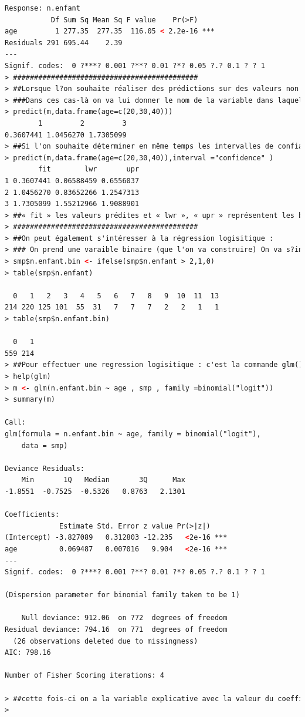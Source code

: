 \begin{lstlisting}[language=html]
Response: n.enfant
           Df Sum Sq Mean Sq F value    Pr(>F)    
age         1 277.35  277.35  116.05 < 2.2e-16 ***
Residuals 291 695.44    2.39                      
---
Signif. codes:  0 ?***? 0.001 ?**? 0.01 ?*? 0.05 ?.? 0.1 ? ? 1
> ############################################
> ##Lorsque l?on souhaite réaliser des prédictions sur des valeurs non nécessairement observées on peut utiliser la commande predict().
> ###Dans ces cas-là on va lui donner le nom de la variable dans laquelle on a stocké notre modèle de régression et un data-frame dans lequel on va indiquer pour la variable qui sert de variable explicative les valeurs pour lesquelles on souhaite effectuer la prédiction.
> predict(m,data.frame(age=c(20,30,40)))
        1         2         3 
0.3607441 1.0456270 1.7305099 
> ##Si l'on souhaite déterminer en même temps les intervalles de confiances :
> predict(m,data.frame(age=c(20,30,40)),interval ="confidence" )
        fit        lwr       upr
1 0.3607441 0.06588459 0.6556037
2 1.0456270 0.83652266 1.2547313
3 1.7305099 1.55212966 1.9088901
> ##« fit » les valeurs prédites et « lwr », « upr » représentent les bornes inférieures et supérieures des intervalles de confiance à 95% pour la prévision.
> ############################################
> ##On peut également s'intéresser à la régression logisitique :
> ### On prend une varaible binaire (que l'on va construire) On va s?intéresser au nombre d?enfants supérieur à 2. Dans ces cas-là on codera 1 sinon on code 0
> smp$n.enfant.bin <- ifelse(smp$n.enfant > 2,1,0)
> table(smp$n.enfant)

  0   1   2   3   4   5   6   7   8   9  10  11  13 
214 220 125 101  55  31   7   7   7   2   2   1   1 
> table(smp$n.enfant.bin)

  0   1 
559 214 
> ##Pour effectuer une regression logisitique : c'est la commande glm() : Generalized Linear Models
> help(glm)
> m <- glm(n.enfant.bin ~ age , smp , family =binomial("logit"))
> summary(m)

Call:
glm(formula = n.enfant.bin ~ age, family = binomial("logit"), 
    data = smp)

Deviance Residuals: 
    Min       1Q   Median       3Q      Max  
-1.8551  -0.7525  -0.5326   0.8763   2.1301  

Coefficients:
             Estimate Std. Error z value Pr(>|z|)    
(Intercept) -3.827089   0.312803 -12.235   <2e-16 ***
age          0.069487   0.007016   9.904   <2e-16 ***
---
Signif. codes:  0 ?***? 0.001 ?**? 0.01 ?*? 0.05 ?.? 0.1 ? ? 1

(Dispersion parameter for binomial family taken to be 1)

    Null deviance: 912.06  on 772  degrees of freedom
Residual deviance: 794.16  on 771  degrees of freedom
  (26 observations deleted due to missingness)
AIC: 798.16

Number of Fisher Scoring iterations: 4

> ##cette fois-ci on a la variable explicative avec la valeur du coefficient de régression sur l?échelle du log odds.
> 
\end{lstlisting}
